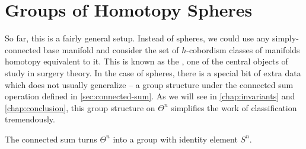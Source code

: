 \section{Groups of Homotopy Spheres}\label{sec:groups-of-homotopy-spheres}

So far, this is a fairly general setup. Instead of spheres, we could use any simply-connected base manifold and consider the set of $h$-cobordism classes of manifolds homotopy equivalent to it. This is known as the , one of the central objects of study in surgery theory. In the case of spheres, there is a special bit of extra data which does not usually generalize -- a group structure under the connected sum operation defined in \cref{sec:connected-sum}. 
As we will see in \cref{chap:invariants} and \cref{chap:conclusion}, this group structure on $\Theta^n$ simplifies the work of classification tremendously.

\begin{theorem}\label{thm:group-of-homotopy-spheres}
	The connected sum turns $\Theta^n$ into a group with identity element $S^n$.
\end{theorem}

